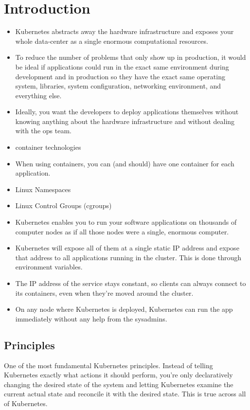 
\chapter{Introduction}

\begin{itemize}
	\item Kubernetes abstracts away the hardware infrastructure and exposes your whole data-center as a single enormous computational resources.
	\item To reduce the number of problems that only show up in production, it would be ideal if applications could run in the exact same environment during development and in production so they have the exact same operating system, libraries, system configuration, networking environment, and everything else.
	\item Ideally, you want the developers to deploy applications themselves without knowing anything about the hardware infrastructure and without dealing with the ops team.
	\item container technologies
	\item When using containers, you can (and should) have one container for each application.
	\item Linux Namespaces
	\item Linux Control Groups (cgroups)
	\item Kubernetes enables you to run your software applications on thousands of computer nodes as if all those nodes were a single, enormous computer.
	\item Kubernetes will expose all of them at a single static IP address and expose that address to all applications running in the cluster. This is done through environment variables.
	\item The IP address of the service stays constant, so clients can always connect to its containers, even when they're moved around the cluster.
	\item On any node where Kubernetes is deployed, Kubernetes can run the app immediately without any help from the sysadmins.
\end{itemize}


\section{Principles}

One of the most fundamental Kubernetes principles. Instead of telling Kubernetes exactly what actions it should perform, you're only declaratively changing the desired state of the system and letting Kubernetes examine the current actual state and reconcile it with the desired state. This is true across all of Kubernetes.

